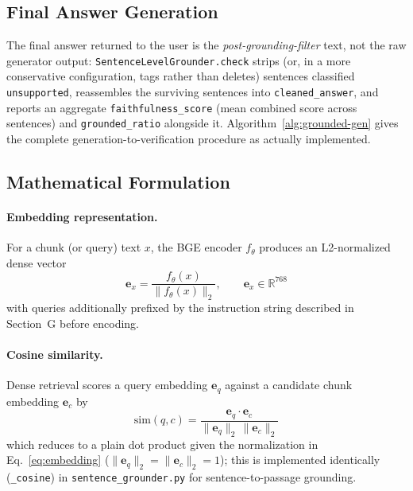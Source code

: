 \documentclass[conference]{IEEEtran}
\begin{document}
\subsection{Final Answer Generation}
The final answer returned to the user is the \emph{post-grounding-filter} text, not the raw generator output: \texttt{SentenceLevelGrounder.check} strips (or, in a more conservative configuration, tags rather than deletes) sentences classified \texttt{unsupported}, reassembles the surviving sentences into \texttt{cleaned\_answer}, and reports an aggregate \texttt{faithfulness\_score} (mean combined score across sentences) and \texttt{grounded\_ratio} alongside it. Algorithm~\ref{alg:grounded-gen} gives the complete generation-to-verification procedure as actually implemented.

\subsection{Mathematical Formulation}

\paragraph{Embedding representation.}
For a chunk (or query) text $x$, the BGE encoder $f_\theta$ produces an L2-normalized dense vector
\begin{equation}
\mathbf{e}_x = \frac{f_\theta(x)}{\lVert f_\theta(x) \rVert_2}, \qquad \mathbf{e}_x \in \mathbb{R}^{768}
\label{eq:embedding}
\end{equation}
with queries additionally prefixed by the instruction string described in Section~G before encoding.

\paragraph{Cosine similarity.}
Dense retrieval scores a query embedding $\mathbf{e}_q$ against a candidate chunk embedding $\mathbf{e}_c$ by
\begin{equation}
\text{sim}(q, c) = \frac{\mathbf{e}_q \cdot \mathbf{e}_c}{\lVert \mathbf{e}_q \rVert_2 \, \lVert \mathbf{e}_c \rVert_2}
\label{eq:cosine}
\end{equation}
which reduces to a plain dot product given the normalization in Eq.~\ref{eq:embedding} ($\lVert \mathbf{e}_q\rVert_2 = \lVert \mathbf{e}_c\rVert_2 = 1$); this is implemented identically (\texttt{\_cosine}) in \texttt{sentence\_grounder.py} for sentence-to-passage grounding.
\end{document}
